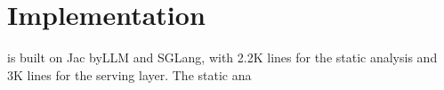 \section{Implementation}
\label{sec:implementation}
\sysname is built on Jac byLLM and SGLang, with 2.2K lines for the static analysis and 3K lines for the serving layer. The static ana 